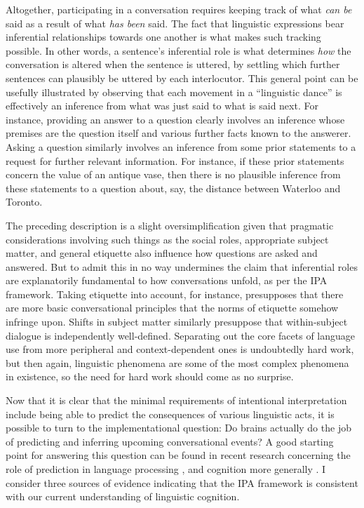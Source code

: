 Altogether, participating in a conversation requires keeping track of what \textit{can be} said as a result of what \textit{has been} said. The fact that linguistic expressions bear inferential relationships towards one another is what makes such tracking possible. In other words, a sentence's inferential role is what determines \textit{how} the conversation is altered when the sentence is uttered, by settling which further sentences can plausibly be uttered by each interlocutor. This general point can be usefully illustrated by observing that each movement in a ``linguistic dance'' is effectively an inference from what was just said to what is said next. For instance, providing an answer to a question clearly involves an inference whose premises are the question itself and various further facts known to the answerer. Asking a question similarly involves an inference from some prior statements to a request for further relevant information. For instance, if these prior statements concern the value of an antique vase, then there is no plausible inference from these statements to a question about, say, the distance between Waterloo and Toronto.  

The preceding description is a slight oversimplification given that pragmatic considerations involving such things as the social roles, appropriate subject matter, and general etiquette also influence how questions are asked and answered. But to admit this in no way undermines the claim that inferential roles are explanatorily fundamental to how conversations unfold, as per the IPA framework. Taking etiquette into account, for instance, presupposes that there are more basic conversational principles that the norms of etiquette somehow infringe upon. Shifts in subject matter similarly presuppose that within-subject dialogue is independently well-defined. Separating out the core facets of language use from more peripheral and context-dependent ones is undoubtedly hard work, but then again, linguistic phenomena are some of the most complex phenomena in existence, so the need for hard work should come as no surprise.

Now that it is clear that the minimal requirements of intentional interpretation include being able to predict the consequences of various linguistic acts, it is possible to turn to the implementational question: Do brains actually do the job of predicting and inferring upcoming conversational events? A good starting point for answering this question can be found in recent research concerning the role of prediction in language processing \citep{Pickering:2013,Pickering:2007,Christiansen:2015}, and cognition more generally \citep{clark:2013}. I consider three sources of evidence indicating that the IPA framework is consistent with our current understanding of linguistic cognition.

